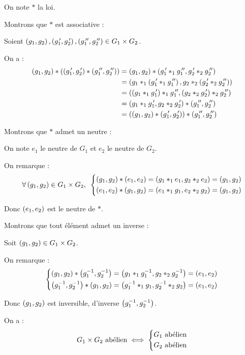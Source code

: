 \begin{dem}
On note \(*\) la loi.

Montrons que \(*\) est associative :

Soient \(\left(g_1,g_2\right),\left(g_1^{\,\prime},g_2^{\,\prime}\right),\left(g_1^{\,\prime\prime},g_2^{\,\prime\prime}\right)\in G_1\times G_2\).

On a : \[\begin{aligned}
\left(g_1,g_2\right)*\left(\left(g_1^{\,\prime},g_2^{\,\prime}\right)*\left(g_1^{\,\prime\prime},g_2^{\,\prime\prime}\right)\right)&=\left(g_1,g_2\right)*\left(g_1^{\,\prime}*_1g_1^{\,\prime\prime},g_2^{\,\prime}*_2g_2^{\,\prime\prime}\right) \\
&=\left(g_1*_1\left(g_1^{\,\prime}*_1g_1^{\,\prime\prime}\right),g_2*_2\left(g_2^{\,\prime}*_2g_2^{\,\prime\prime}\right)\right) \\
&=\left(\left(g_1*_1g_1^{\,\prime}\right)*_1g_1^{\,\prime\prime},\left(g_2*_2g_2^{\,\prime}\right)*_2g_2^{\,\prime\prime}\right) \\
&=\left(g_1*_1g_1^{\,\prime},g_2*_2g_2^{\,\prime}\right)*\left(g_1^{\,\prime\prime},g_2^{\,\prime\prime}\right) \\
&=\left(\left(g_1,g_2\right)*\left(g_1^{\,\prime},g_2^{\,\prime}\right)\right)*\left(g_1^{\,\prime\prime},g_2^{\,\prime\prime}\right)
\end{aligned}\]

Montrons que \(*\) admet un neutre :

On note \(e_1\) le neutre de \(G_1\) et \(e_2\) le neutre de \(G_2\).

On remarque : \[\quantifs{\forall\paren{g_1,g_2}\in G_1\times G_2}\begin{dcases}\paren{g_1,g_2}*\paren{e_1,e_2}=\paren{g_1*_1e_1,g_2*_2e_2}=\paren{g_1,g_2} \\ \paren{e_1,e_2}*\paren{g_1,g_2}=\paren{e_1*_1g_1,e_2*_2g_2}=\paren{g_1,g_2}\end{dcases}\]

Donc \(\left(e_1,e_2\right)\) est le neutre de \(*\).

Montrons que tout élément admet un inverse :

Soit \(\left(g_1,g_2\right)\in G_1\times G_2\).

On remarque : \[\begin{dcases}\left(g_1,g_2\right)*\left(g_1^{-1},g_2^{-1}\right)=\left(g_1*_1g_1^{-1},g_2*_2g_2^{-1}\right)=\left(e_1,e_2\right) \\ \left(g_1^{-1},g_2^{-1}\right)*\left(g_1,g_2\right)=\left(g_1^{-1}*_1g_1,g_2^{-1}*_2g_2\right)=\left(e_1,e_2\right)\end{dcases}\]

Donc \(\left(g_1,g_2\right)\) est inversible, d'inverse \(\left(g_1^{-1},g_2^{-1}\right)\).
\end{dem}

\begin{rem}
On a : \[G_1\times G_2\text{ abélien}\iff\begin{dcases}G_1\text{ abélien} \\ G_2\text{ abélien}\end{dcases}\]
\end{rem}

